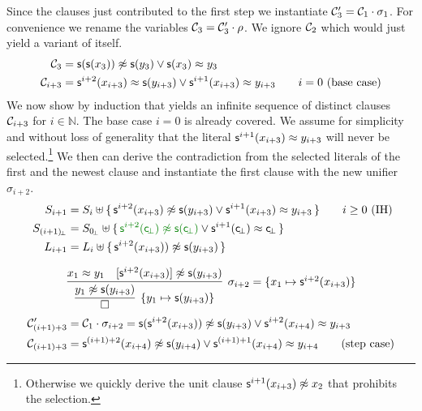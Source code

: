 \begin{example}
Since the clauses just contributed to the first step 
we instantiate ${\mathcal C}'_3 = {\mathcal C}_1\cdot\sigma_1$. 
For convenience we rename the variables ${\mathcal C}_3 = {\mathcal C}_3'\cdot\rho$. 
We ignore ${\mathcal C}_2$ which would just yield a variant of itself.
\begin{align*}
	{\mathcal C}_3 &= {\mathsf s}({\mathsf s}(x_3)) \not\approx {\mathsf s}(y_3) \lor {\mathsf s}(x_3) \approx y_3
	\\
	{\mathcal C}_{i+3} &= {\mathsf s}^{i+2}(x_{i+3})\approx {\mathsf s}(y_{i+3}) \lor {\mathsf s}^{i+1}(x_{i+3})\approx y_{i+3}
	\tag*{$i=0$ (base case)}
	\end{align*}
	We now show by induction that \InstGenEQ yields an infinite sequence of distinct clauses ${\mathcal C}_{i+3}$ for $i\in\mathbb{N}$.
	The base case $i=0$ is already covered. We assume for simplicity and without loss of generality that the literal ${\mathsf s}^{i+1}(x_{i+3})\approx y_{i+3}$ will never be selected.\footnote{
		Otherwise we quickly derive the unit clause ${\mathsf s}^{i+1}(x_{i+3})\not\approx x_2$ that prohibits the selection.}
	We then can derive the contradiction from the selected literals of the first and the newest clause 
	and instantiate the first clause with the new unifier $\sigma_{i+2}$.
	\begin{align*}
	S_{i+1} &= S_i\disjointunion \{\,
	\msucc^{i+2}(x_{i+3}) \mNE \msucc(y_{i+3}) \lor \msucc^{i+1}(x_{i+3}) \mEQ y_{i+3} \,
	\}
	\tag*{$i\geq 0$ (IH)}
	\\
	S_{(i+1)\!_\bot} &= S_{0\!_\bot}\disjointunion \{\,
	{\colHi\msucc^{i+2}(\consbot) \mNE \msucc(\consbot)} \lor {\msucc^{i+1}(\consbot) \mEQ \consbot} \,
	\}
	\\
	L_{i+1} &= L_i \disjointunion \{\, 
		\msucc^{i+2}(x_{i+3})) \mNE \msucc(y_{i+3})
	\,\}
	\\[0.7em]
	&\infer[\sigma_{i+2} = \{ x_1\mapsto \msucc^{i+2}(x_{i+3})\}
	]{ 
		\infer[\{y_1\mapsto \msucc(y_{i+3})\}]{\emptyclause}{ y_1\mNE \msucc(y_{i+3}) }
	}
	{x_1 \mEQ y_1 & [\msucc^{i+2}(x_{i+3})]\mNE \msucc(y_{i+3})}
	\\
	\mcC'_{(i+1)+3} &= \mcC_1\cdot\sigma_{i+2} =
	\msucc(\msucc^{i+2}(x_{i+3})) \mNE \msucc(y_{i+3}) \lor \msucc^{i+2}(x_{i+4}) \mEQ y_{i+3}
	\\
	\mcC_{(i+1)+3} &= 
	\msucc^{(i+1)+2}(x_{i+4}) \mNE \msucc(y_{i+4}) \lor \msucc^{(i+1)+1}(x_{i+4}) \mEQ y_{i+4}
	\tag{step case}
\end{align*}


\end{example}

